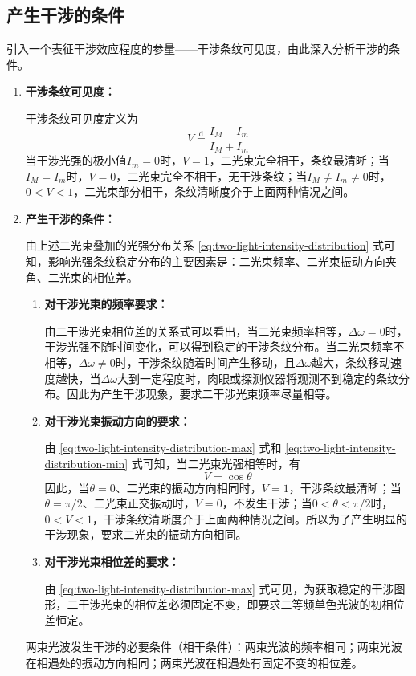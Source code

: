 \documentclass[cn,10pt,chinesefont=founder,math=mtpro2,cite=super,toc=onecol,twoside,openany]{elegantbook}
\begin{document}
\subsection{产生干涉的条件}
引入一个表征干涉效应程度的参量——干涉条纹可见度，由此深入分析干涉的条件。
\begin{enumerate}
	\item \textbf{干涉条纹可见度：}
	
	干涉条纹可见度定义为
	\begin{equation}
	V\overset{\text{d}}{=}\frac{I_M-I_m}{I_M+I_m}
	\end{equation}
	当干涉光强的极小值$I_m=0$时，$V=1$，二光束完全相干，条纹最清晰；当$I_M=I_m$时，$V=0$，二光束完全不相干，无干涉条纹；当$I_M\neq I_m\neq0$时，$0<V<1$，二光束部分相干，条纹清晰度介于上面两种情况之间。
	
	
	\item \textbf{产生干涉的条件：}
	
	由上述二光束叠加的光强分布关系 \eqref{eq:two-light-intensity-distribution} 式可知，影响光强条纹稳定分布的主要因素是：二光束频率、二光束振动方向夹角、二光束的相位差。
	\begin{enumerate}
		\item \textbf{对干涉光束的频率要求：}
		
		由二干涉光束相位差的关系式可以看出，当二光束频率相等，$\Delta\omega=0$时，干涉光强不随时间变化，可以得到稳定的干涉条纹分布。当二光束频率不相等，$\Delta\omega\neq0$时，干涉条纹随着时间产生移动，且$\Delta\omega$越大，条纹移动速度越快，当$\Delta\omega$大到一定程度时，肉眼或探测仪器将观测不到稳定的条纹分布。因此为产生干涉现象，要求二干涉光束频率尽量相等。
		\item \textbf{对干涉光束振动方向的要求：}
		
		由 \eqref{eq:two-light-intensity-distribution-max} 式和 \eqref{eq:two-light-intensity-distribution-min} 式可知，当二光束光强相等时，有
		\begin{equation}
		V=\cos\theta
		\end{equation}
		因此，当$\theta=0$、二光束的振动方向相同时，$V=1$，干涉条纹最清晰；当$\theta=\pi/2$、二光束正交振动时，$V=0$，不发生干涉；当$0<\theta<\pi/2$时，$0<V<1$，干涉条纹清晰度介于上面两种情况之间。所以为了产生明显的干涉现象，要求二光束的振动方向相同。
		\item \textbf{对干涉光束相位差的要求：}
		
		由 \eqref{eq:two-light-intensity-distribution-max} 式可见，为获取稳定的干涉图形，二干涉光束的相位差必须固定不变，即要求二等频单色光波的初相位差恒定。
	\end{enumerate}
	\begin{conclusion}
	两束光波发生干涉的必要条件（相干条件）：两束光波的频率相同；两束光波在相遇处的振动方向相同；两束光波在相遇处有固定不变的相位差。
	\end{conclusion}
\end{enumerate}
\end{document}
